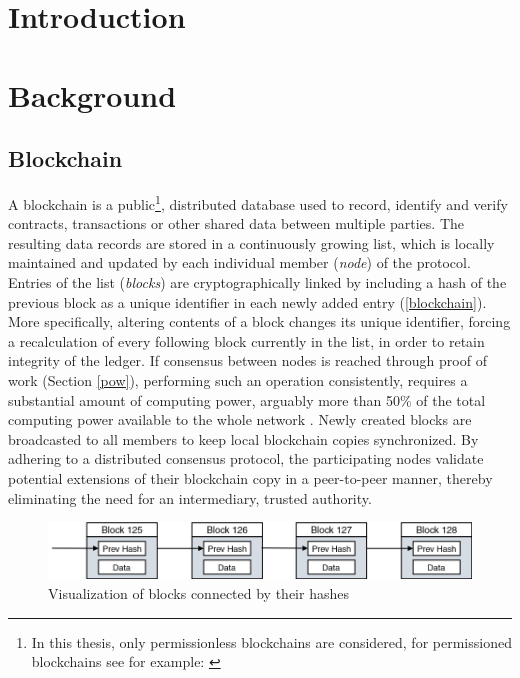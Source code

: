 \documentclass[a4paper,12pt,twoside]{report}
\begin{document}

\fancyhead{}
\pagestyle{fancy}
\fancyhead[LE]{\slshape \leftmark}
\fancyhead[RO]{\slshape \rightmark}
\headheight=15pt





\chapter{Introduction}



\chapter{Background}
\section{Blockchain}
A blockchain is a public\footnote{In this thesis, only permissionless blockchains are considered, for permissioned blockchains see for example: \cite{permissioned}}, distributed database used to record, identify and verify contracts, transactions or other shared data between multiple parties. The resulting data records are stored in a continuously growing list, which is locally maintained and updated by each individual member (\textit{node}) of the protocol. Entries of the list (\textit{blocks}) are cryptographically linked by including a hash of the previous block as a unique identifier in each newly added entry (\autoref{blockchain}). More specifically, altering contents of a block changes its unique identifier, forcing a recalculation of every following block currently in the list, in order to retain integrity of the ledger. If consensus between nodes is reached through proof of work (Section \ref{pow}), performing such an operation consistently, requires a substantial amount of computing power, arguably more than 50\% of the total computing power available to the whole network \cite{nakamoto2008bitcoin}. Newly created blocks are broadcasted to all members to keep local blockchain copies synchronized. By adhering to a distributed consensus protocol, the participating nodes validate potential extensions of their blockchain copy in a peer-to-peer manner, thereby eliminating the need for an intermediary, trusted authority. 

\begin{figure}[ht]
	\centering
  \includegraphics[width=\textwidth]{blockchain.png}
	\caption{Visualization of blocks connected by their hashes}
	\label{blockchain}
\end{figure}
 
\end{document}
